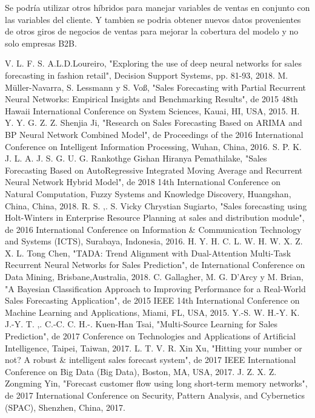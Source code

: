 \documentclass[conference]{IEEEtran}
\begin{document}
Se podría utilizar otros híbridos para manejar variables de ventas en conjunto con las variables del cliente. Y tambien se podria obtener nuevos datos provenientes de otros giros de negocios de ventas para mejorar la cobertura del modelo y no solo empresas B2B.
\begin{thebibliography}{00}
     V. L. F. S. A.L.D.Loureiro, "Exploring the use of deep neural networks for sales forecasting in fashion retail", Decision Support Systems, pp. 81-93, 2018.
     M. Müller-Navarra, S. Lessmann y S. Voß, "Sales Forecasting with Partial Recurrent Neural Networks: Empirical Insights and Benchmarking Results", de 2015 48th Hawaii International Conference on System Sciences, Kauai, HI, USA, 2015.
     H. Y. Y. G. Z. Z. Shenjia Ji, "Research on Sales Forecasting Based on ARIMA and BP Neural Network Combined Model", de Proceedings of the 2016 International Conference on Intelligent Information Processing, Wuhan, China, 2016.
     S. P. K. J. L. A. J. S. G. U. G. Rankothge Gishan Hiranya Pemathilake, "Sales Forecasting Based on AutoRegressive Integrated Moving Average and Recurrent Neural Network Hybrid Model", de 2018 14th International Conference on Natural Computation, Fuzzy Systems and Knowledge Discovery, Huangshan, China, China, 2018.
     R. S. ,. S. Vicky Chrystian Sugiarto, "Sales forecasting using Holt-Winters in Enterprise Resource Planning at sales and distribution module", de 2016 International Conference on Information \& Communication Technology and Systems (ICTS), Surabaya, Indonesia, 2016.
     H. Y. H. C. L. W. H. W. X. Z. X. L. Tong Chen, "TADA: Trend Alignment with Dual-Attention Multi-Task Recurrent Neural Networks for Sales Prediction", de International Conference on Data Mining, Brisbane,Australia, 2018.
     C. Gallagher, M. G. D’Arcy y M. Brian, "A Bayesian Classification Approach to Improving Performance for a Real-World Sales Forecasting Application", de 2015 IEEE 14th International Conference on Machine Learning and Applications, Miami, FL, USA, 2015.
     Y.-S. W. H.-Y. K. J.-Y. T. ,. C.-C. C. H.-. Kuen-Han Tsai, "Multi-Source Learning for Sales Prediction", de 2017 Conference on Technologies and Applications of Artificial Intelligence, Taipei, Taiwan, 2017.
     L. T. V. R. Xin Xu, "Hitting your number or not? A robust \& intelligent sales forecast system", de 2017 IEEE International Conference on Big Data (Big Data), Boston, MA, USA, 2017.
     J. Z. X. Z. Zongming Yin, "Forecast customer flow using long short-term memory networks", de 2017 International Conference on Security, Pattern Analysis, and Cybernetics (SPAC), Shenzhen, China, 2017.

\end{thebibliography}
\end{document}
